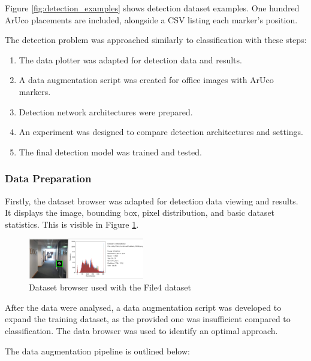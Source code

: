 \documentclass[conference]{IEEEtran}
\begin{document}
Figure \ref{fig:detection_examples} shows detection dataset examples. One hundred ArUco placements are included, alongside 
a CSV listing each marker's position.

The detection problem was approached similarly to classification with these steps: 

\begin{enumerate}
  \item The data plotter was adapted for detection data and results.
  \item A data augmentation script was created for office images with ArUco markers.
  \item Detection network architectures were prepared.
  \item An experiment was designed to compare detection architectures and settings.
  \item The final detection model was trained and tested.
\end{enumerate}

\subsubsection{Data Preparation}

Firstly, the dataset browser was adapted for detection data viewing and results. It displays the image, bounding box, pixel
distribution, and basic dataset statistics. This is visible in Figure \ref{fig:data_browser_2}.

\begin{figure}[h]
  \centering
  \includegraphics[width=0.45\textwidth]{images/aruco-dataset-browser-2.png}
  \caption{Dataset browser used with the File4 dataset}
  \label{fig:data_browser_2}
\end{figure}

After the data were analysed, a data augmentation script was developed to expand the training dataset, as the provided one was
insufficient compared to classification. The data browser was used to identify an optimal approach.

The data augmentation pipeline is outlined below:
\end{document}

